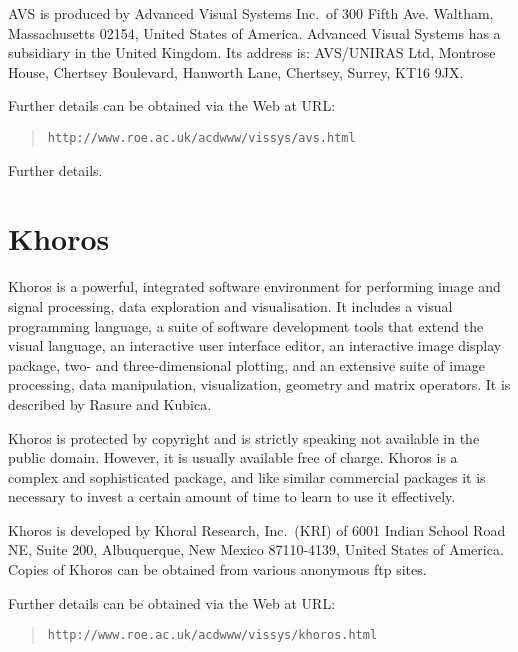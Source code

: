 \documentclass[twoside,11pt]{article}
\newcommand{\htmladdnormallink}[2]{#1}
\newenvironment{latexonly}{}{}
\newcommand{\xlabel}[1]{}
\begin{document}
AVS is produced by Advanced Visual Systems Inc.\ of 300 Fifth Ave.
Waltham, Massachusetts 02154, United States of America. Advanced Visual
Systems has a subsidiary in the United Kingdom. Its address is:
AVS/UNIRAS Ltd, Montrose House, Chertsey Boulevard, Hanworth Lane,
Chertsey, Surrey, KT16 9JX.

\begin{latexonly}
Further details can be obtained via the Web at URL:

\begin{quote}
{\tt http://www.roe.ac.uk/acdwww/vissys/avs.html}
\end{quote}
\end{latexonly}

\begin{htmlonly}
\htmladdnormallink{Further details}
{http://www.roe.ac.uk/acdwww/vissys/avs.html}.
\end{htmlonly}


\section{Khoros \label{KHOROS} \xlabel{KHOROS} }

Khoros is a powerful, integrated software environment for performing
image and signal processing, data exploration and visualisation. It
includes a visual programming language, a suite of software development
tools that extend the visual language, an interactive user interface
editor, an interactive image display package, two- and three-dimensional
 plotting, and an extensive suite of image processing, data manipulation,
visualization, geometry and matrix operators. It is described by
Rasure and Kubica\cite{RASURE}.

Khoros is protected by copyright and is strictly speaking not available
in the public domain. However, it is usually available free of charge.
Khoros is a complex and sophisticated package, and like similar
commercial packages it is necessary to invest a certain amount of time
to learn to use it effectively.

Khoros is developed by Khoral Research, Inc.\ (KRI) of 6001 Indian
School Road NE, Suite 200, Albuquerque, New Mexico 87110-4139, United
States of America. Copies of Khoros can be obtained from various anonymous
ftp sites.

\begin{latexonly}
Further details can be obtained via the Web at URL:

\begin{quote}
{\tt http://www.roe.ac.uk/acdwww/vissys/khoros.html}
\end{quote}
\end{latexonly}
\end{document}
